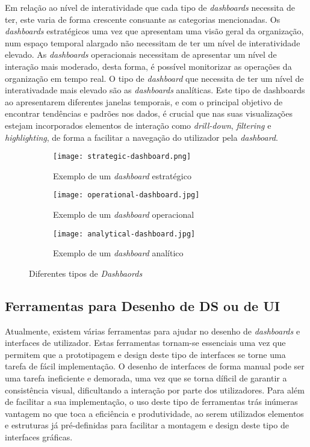 Em relação ao nível de interatividade que cada tipo de \textit{dashboards} necessita de ter, este varia de forma crescente consuante as categorias mencionadas. Os \textit{dashboards} estratégicos uma vez que apresentam uma visão geral da organização, num espaço temporal alargado não necessitam de ter um nível de interatividade elevado. As \textit{dashboards} operacionais necessitam de apresentar um nível de interação mais moderado, desta forma, é possível monitorizar as operações da organização em tempo real. O tipo de \textit{dashboard} que necessita de ter um nível de interativadade mais elevado são as \textit{dashboards} analíticas. Este tipo de dashboards ao apresentarem diferentes janelas temporais, e com o principal objetivo de encontrar tendências e padrões nos dados, é crucial que nas suas visualizações estejam incorporados elementos de interação como \textit{drill-down}, \textit{filtering} e \textit{highlighting}, de forma a facilitar a navegação do utilizador pela \textit{dashboard}.

\begin{figure}[htbp]
  \begin{subfigure}{0.5\textwidth}
    \texttt{[image: strategic-dashboard.png]} 
    \caption{Exemplo de um \textit{dashboard} estratégico}
    \label{fig:strat-dash}
  \end{subfigure}
  \begin{subfigure}{0.5\textwidth}
    \texttt{[image: operational-dashboard.jpg]}
    \caption{Exemplo de um \textit{dashboard} operacional}
    \label{fig:op-dash}
  \end{subfigure}
  \begin{subfigure}{0.5\textwidth}
    \texttt{[image: analytical-dashboard.jpg]}
    \caption{Exemplo de um \textit{dashboard} analítico}
    \label{fig:anal-dash}
  \end{subfigure}
  
  \caption{Diferentes tipos de \textit{Dashbaords}}
  \label{fig:image2}
\end{figure}

\subsection{Ferramentas para Desenho de DS ou de UI} %
\label{sub:ferramentas}

Atualmente, existem várias ferramentas para ajudar no desenho de \textit{dashboards} e interfaces de utilizador. Estas ferramentas tornam-se essenciais uma vez que permitem que a prototipagem e design deste tipo de interfaces se torne uma tarefa de fácil implementação. O desenho de interfaces de forma manual pode ser uma tarefa ineficiente e demorada, uma vez que se torna díficil de garantir a consistência visual, dificultando a interação por parte dos utilizadores. Para além de facilitar a sua implementação, o uso deste tipo de ferramentas trás inúmeras vantagem no que toca a eficiência e produtividade, ao serem utilizados elementos e estruturas já pré-definidas para facilitar a montagem e design deste tipo de interfaces gráficas.

